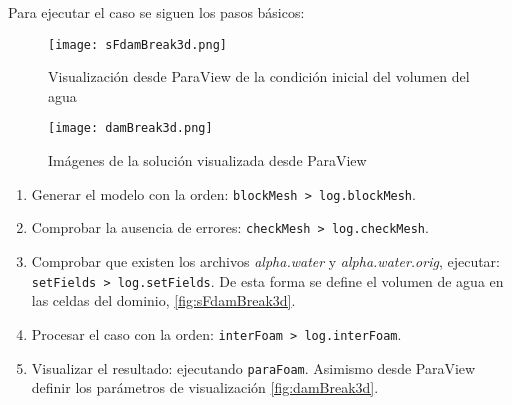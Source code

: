 Para ejecutar el caso se siguen los pasos básicos:

\begin{figure}
\centering
\texttt{[image: sFdamBreak3d.png]}
\caption[Condición inicial del volumen del agua]{Visualización desde ParaView de la condición inicial del volumen del agua}
\label{fig:sFdamBreak3d}
\end{figure}

\begin{figure}
\centering
\texttt{[image: damBreak3d.png]}
\caption{Imágenes de la solución visualizada desde ParaView}
\label{fig:damBreak3d}
\end{figure}

\begin{enumerate}
\def\labelenumi{\arabic{enumi}.}
\item
  Generar el modelo con la orden:
  \lstinline[style=bash]{blockMesh > log.blockMesh}.
\item
  Comprobar la ausencia de errores:
  \lstinline[style=bash]{checkMesh > log.checkMesh}.
\item
  Comprobar que existen los archivos \emph{alpha.water} y
  \emph{alpha.water.orig}, ejecutar:
  \lstinline[style=bash]{setFields > log.setFields}.
  De esta forma se define el volumen de agua en las celdas del dominio, \autoref{fig:sFdamBreak3d}.
\item
  Procesar el caso con la orden:
  \lstinline[style=bash]{interFoam > log.interFoam}.
\item
  Visualizar el resultado: ejecutando \lstinline[style=bash]{paraFoam}.  
  Asimismo desde ParaView definir los parámetros de visualización \autoref{fig:damBreak3d}.
\end{enumerate}
